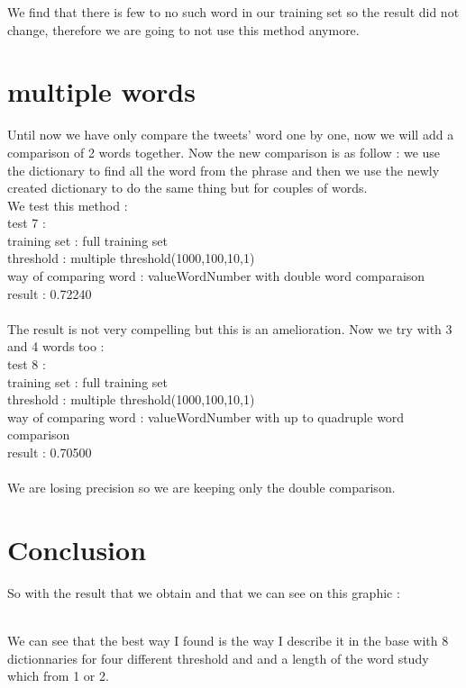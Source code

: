 \documentclass{article}
\begin{document}
We find that there is few to no such word in our training set so the result did not change, therefore we are going to not use this method anymore.

\section {multiple words }
Until now we have only compare the tweets' word one by one, now we will add a comparison of 2 words together. Now the new comparison is as follow : we use the dictionary to find all the word from the phrase and then we use the newly created dictionary to do the same thing but for couples of words.\\
 We test this method :
\\
 test 7 :\\ 
 training set : full training set\\
 threshold : multiple threshold(1000,100,10,1)\\
 way of comparing word : valueWordNumber with double word comparaison\\
 result :  0.72240\\
 \\
The result is not very compelling but this is an amelioration. Now we try with 3 and 4 words too :
\\
 test 8 :\\ 
 training set : full training set\\
 threshold : multiple threshold(1000,100,10,1)\\
 way of comparing word : valueWordNumber with up to quadruple word comparison\\
 result :  0.70500\\
 \\
 We are losing precision so we are keeping only the double comparison.

\section{Conclusion}
So with the result that we obtain and that we can see on this graphic :\\
 \\
We can see that the best way I found is the way I describe it in the base with 8 dictionnaries for four different threshold and and a length of the word study which from 1 or 2.
\end{document}

